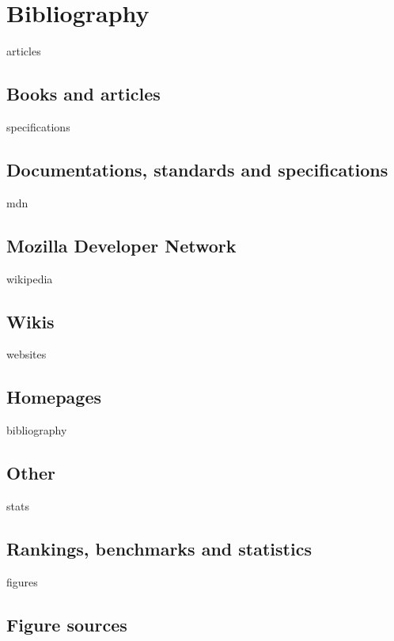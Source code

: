 
%

\chapter*{Bibliography}
\begin{btSect}{articles}
    \section*{Books and articles}
    \btPrintCited
\end{btSect}
\begin{btSect}{specifications}
    \section*{Documentations, standards and specifications}
    \btPrintCited
\end{btSect}
\begin{btSect}{mdn}
    \section*{Mozilla Developer Network}
    \btPrintCited
\end{btSect}
\begin{btSect}{wikipedia}
    \section*{Wikis}
    \btPrintCited
\end{btSect}
\begin{btSect}{websites}
    \section*{Homepages}
    \btPrintCited
\end{btSect}
\begin{btSect}{bibliography}
    \section*{Other}
    \btPrintCited
\end{btSect}
\begin{btSect}{stats}
    \section*{Rankings, benchmarks and statistics}
    \btPrintCited
\end{btSect}
\begin{btSect}{figures}
    \section*{Figure sources}
    \btPrintCited
\end{btSect}